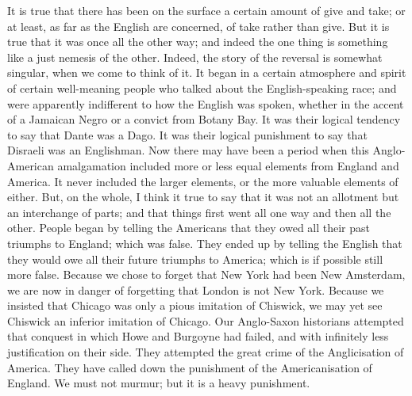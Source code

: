 \documentclass{book}
\begin{document}
It is true that there has been on the surface a certain amount of give and take; or at least, as far as the English are concerned, of take rather than give. But it is true that it was once all the other way; and indeed the one thing is something like a just nemesis of the other. Indeed, the story of the reversal is somewhat singular, when we come to think of it. It began in a certain atmosphere and spirit of certain well-meaning people who talked about the English-speaking race; and were apparently indifferent to how the English was spoken, whether in the accent of a Jamaican Negro or a convict from Botany Bay. It was their logical tendency to say that Dante was a Dago. It was their logical punishment to say that Disraeli was an Englishman. Now there may have been a period when this Anglo-American amalgamation included more or less equal elements from England and America. It never included the larger elements, or the more valuable elements of either. But, on the whole, I think it true to say that it was not an allotment but an interchange of parts; and that things first went all one way and then all the other. People began by telling the Americans that they owed all their past triumphs to England; which was false. They ended up by telling the English that they would owe all their future triumphs to America; which is if possible still more false. Because we chose to forget that New York had been New Amsterdam, we are now in danger of forgetting that London is not New York. Because we insisted that Chicago was only a pious imitation of Chiswick, we may yet see Chiswick an inferior imitation of Chicago. Our Anglo-Saxon historians attempted that conquest in which Howe and Burgoyne had failed, and with infinitely less justification on their side. They attempted the great crime of the Anglicisation of America. They have called down the punishment of the Americanisation of England. We must not murmur; but it is a heavy punishment.
\end{document}

